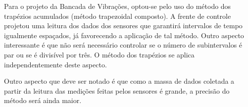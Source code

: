 Para o projeto da Bancada de Vibrações, optou-se pelo uso do método dos trapézios acumulados (método trapezoidal composto). A frente de controle projetou uma leitura dos dados dos sensores que garantirá intervalos de tempo igualmente espaçados, já favorecendo a aplicação de tal método. Outro aspecto interessante é que não será necessário controlar se o número de subintervalos é par ou se é divisível por três. O método dos trapézios se aplica independentemente deste aspecto.

Outro aspecto que deve ser notado é que como a massa de dados coletada a partir da leitura das medições feitas pelos sensores é grande, a precisão do método será ainda maior.